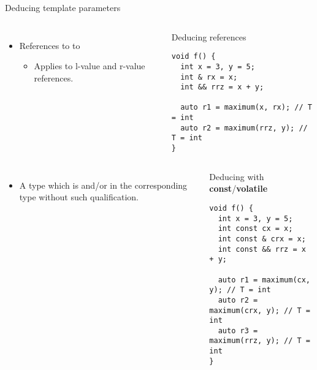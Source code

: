 \begin{frame}{Deducing template parameters}

\begin{columns}

\begin{itemize}
  \item References to   to 
    \begin{itemize}
      \item Applies to l-value and r-value references.
    \end{itemize}
\end{itemize}

\begin{block}{Deducing references}
\begin{lstlisting}
void f() {
  int x = 3, y = 5;
  int & rx = x;
  int && rrz = x + y;

  auto r1 = maximum(x, rx); // T = int
  auto r2 = maximum(rrz, y); // T = int
}
\end{lstlisting}
\end{block}

\end{columns}

\framebreak

\begin{columns}

\begin{itemize}
  \item A type  which is  and/or 
         in the corresponding type without such qualification.
\end{itemize}

\begin{block}{Deducing with \textbf{const}/\textbf{volatile}}
\begin{lstlisting}
void f() {
  int x = 3, y = 5;
  int const cx = x;
  int const & crx = x;
  int const && rrz = x + y;

  auto r1 = maximum(cx, y); // T = int
  auto r2 = maximum(crx, y); // T = int
  auto r3 = maximum(rrz, y); // T = int
}
\end{lstlisting}
\end{block}
\end{columns}

\framebreak

\begin{columns}


\end{columns}
\end{frame}
